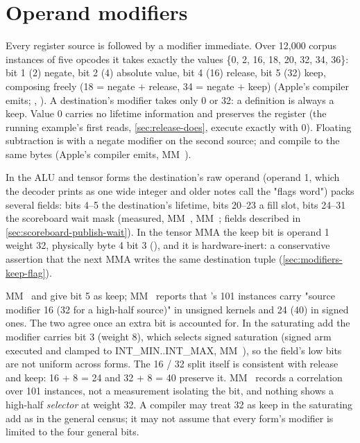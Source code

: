 \section{Operand modifiers}\label{sec:operand-modifiers}

Every register source is followed by a modifier immediate. Over 12,000 corpus instances of five opcodes
it takes exactly the values \{0, 2, 16, 18, 20, 32, 34, 36\}: bit 1 (2) negate, bit 2 (4) absolute value, bit 4 (16)
release, bit 5 (32) keep, composing freely (18 = negate + release, 34 = negate + keep) (Apple's compiler emits;
, ). A destination's modifier takes only 0 or 32: a definition
is always a keep. Value 0 carries no lifetime information and preserves the register (the running example's first
reads, \cref{sec:release-does}, execute exactly with 0). Floating subtraction is  with a negate modifier on the
second source;  and  compile to the same bytes (Apple's compiler emits, MM~).

In the ALU and tensor forms the destination's raw operand (operand 1, which
the decoder prints as one wide integer and older notes call the "flags word") packs several fields: bits 4–5 the
destination's lifetime, bits 20–23 a fill slot, bits 24–31 the scoreboard wait mask (measured, MM~, MM~; fields described in \cref{sec:scoreboard-publish-wait}). In the
tensor MMA the keep bit is operand 1 weight 32, physically byte 4 bit 3 (), and
it is hardware-inert: a conservative assertion that the next MMA writes the same destination tuple (\cref{sec:modifiers-keep-flag}).

MM~ and  give bit 5 as keep; MM~ reports that
's 101 instances carry "source modifier 16 (32 for a high-half source)" in unsigned
kernels and 24 (40) in signed ones. The two agree once an extra bit is accounted for. In
the saturating add the modifier carries bit 3 (weight 8), which selects signed saturation (signed arm executed and clamped to
INT\_MIN..INT\_MAX, MM~), so the field's low bits are not uniform across forms. The 16 / 32 split itself is
consistent with release and keep: 16 + 8 = 24 and 32 + 8 = 40 preserve it. MM~ records a correlation over 101
instances, not a measurement isolating the bit, and nothing shows a high-half \emph{selector} at weight 32. A compiler may
treat 32 as keep in the saturating add as in the general census; it may not assume that every form's modifier is limited to the
four general bits.

